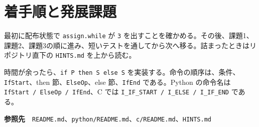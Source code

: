 \documentclass[a4paper,11pt]{ltjsarticle}
\begin{document}
\section{着手順と発展課題}

最初に配布状態で \texttt{assign.while} が \texttt{3} を出すことを確かめる。その後、課題1、課題2、課題3の順に進み、短いテストを通してから次へ移る。詰まったときはリポジトリ直下の \texttt{HINTS.md} を上から読む。

時間が余ったら、\texttt{if P then S else S} を実装する。命令の順序は、条件、\texttt{IfStart}、then 節、\texttt{ElseOp}、else 節、\texttt{IfEnd} である。Python の命令名は \texttt{IfStart / ElseOp / IfEnd}、C では \texttt{I\_IF\_START / I\_ELSE / I\_IF\_END} である。

\vfill
\noindent\small\textbf{参照先}　\texttt{README.md}、\texttt{python/README.md}、\texttt{c/README.md}、\texttt{HINTS.md}
\end{document}
